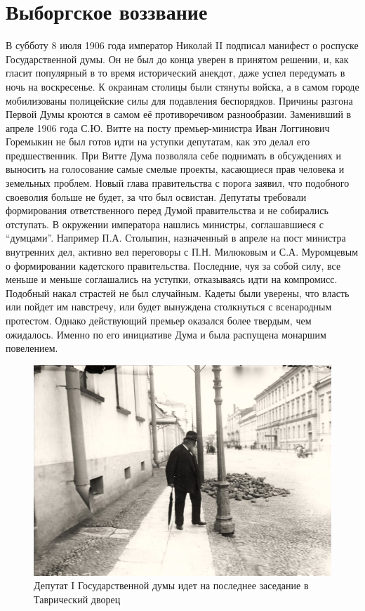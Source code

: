 \chapter{Выборгское воззвание}

В субботу 8 июля 1906 года император Николай II подписал манифест о роспуске Государственной думы. Он не был до конца уверен в принятом решении, и, как гласит популярный в то время исторический анекдот, даже успел передумать в ночь на воскресенье. К окраинам столицы были стянуты войска, а в самом городе мобилизованы полицейские силы для подавления беспорядков.
Причины разгона Первой Думы кроются в самом её противоречивом разнообразии. Заменивший в апреле 1906 года С.Ю. Витте на посту премьер-министра Иван Логгинович Горемыкин не был готов идти на уступки депутатам, как это делал его предшественник. При Витте Дума позволяла себе поднимать в обсуждениях и выносить на голосование самые смелые проекты, касающиеся прав человека и земельных проблем. Новый глава правительства с порога заявил, что подобного своеволия больше не будет, за что был освистан. Депутаты требовали формирования ответственного перед Думой правительства и не собирались отступать.
В окружении императора нашлись министры, соглашавшиеся с “думцами”. Например П.А. Столыпин, назначенный в апреле на пост министра внутренних дел, активно вел переговоры с П.Н. Милюковым и С.А. Муромцевым о формировании кадетского правительства. Последние, чуя за собой силу, все меньше и меньше соглашались на уступки, отказываясь идти на компромисс. Подобный накал страстей не был случайным. Кадеты были уверены, что власть или пойдет им навстречу, или будет вынуждена столкнуться с всенародным протестом. Однако действующий премьер оказался более твердым, чем ожидалось. Именно по его инициативе Дума и была распущена монаршим повелением.

\begin{figure}[h!tb] 
	\centering\includegraphics[scale=0.4]{Vozzvanie/JO61mEi5J00.jpg}
	\caption{Депутат I Государственной думы идет на последнее заседание в Таврический дворец }%
\end{figure}

